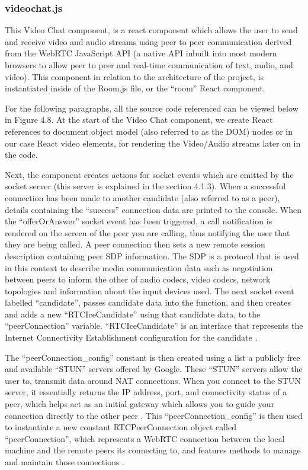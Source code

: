 \subsubsection{videochat.js}
This Video Chat component, is a react component which allows the user to send and receive video and audio streams using peer to peer communication derived from the WebRTC JavaScript API (a native API inbuilt into most modern browsers to allow peer to peer and real-time communication of text, audio, and video). This component in relation to the architecture of the project, is instantiated inside of the Room.js file, or the “room” React component.

For the following paragraphs, all the source code referenced can be viewed below in Figure 4.8. At the start of the Video Chat component, we create React references to document object model (also referred to as the DOM) nodes or in our case React video elements, for rendering the Video/Audio streams later on in the code.

Next, the component creates actions for socket events which are emitted by the socket server (this server is explained in the section 4.1.3). When a successful connection has been made to another candidate (also referred to as a peer), details containing the “success” connection data are printed to the console. When the “offerOrAnswer” socket event has been triggered, a call notification is rendered on the screen of the peer you are calling, thus notifying the user that they are being called. A peer connection then sets a new remote session description containing peer SDP information. The SDP is a protocol that is used in this context to describe media communication data such as negotiation between peers to inform the other of audio codecs, video codecs, network topologies and information about the input devices used. The next socket event labelled “candidate”, passes candidate data into the function, and then creates and adds a new “RTCIceCandidate” using that candidate data, to the “peerConnection” variable. “RTCIceCandidate” is an interface that represents the Internet Connectivity Establishment configuration for the candidate \cite{rtcicecandidate}.

The “peerConnection\_config” constant is then created using a list a publicly free and available “STUN” servers offered by Google. These “STUN” servers allow the user to, transmit data around NAT connections. When you connect to the STUN server, it essentially returns the IP address, port, and connectivity status of a peer, which helps act as an initial gateway which allows you to guide your connection directly to the other peer \cite{stun}. This “peerConnection\_config” is then used to instantiate a new constant RTCPeerConnection object called “peerConnection”, which represents a WebRTC connection between the local machine and the remote peers its connecting to, and features methods to manage and maintain those connections \cite{rtcpeerconnection}.

